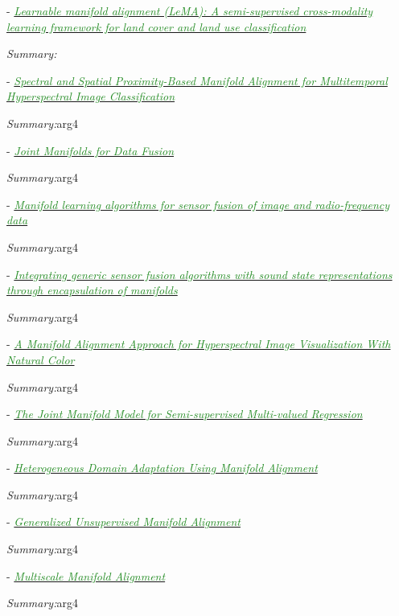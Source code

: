 \documentclass[]{article}
\newcommand{\paperentry}[4]{
            \hangindent=1cm
            \cite{#1} - \href{run:../References/#3}{\textcolor{ForestGreen}{\textit{#2}}}
            
            \noindent            
            \begin{minipage}[t]{0.1\linewidth}\hfill\end{minipage}
            \begin{minipage}[t]{0.8\linewidth}\textcolor{NavyBlue}{{\textit{Summary:}}}#4\end{minipage}
            \vspace{.25cm}
          }
\begin{document}
		\paperentry{Hong2019LearnableManifoldAlignment}
		{Learnable manifold alignment (LeMA): A semi-supervised cross-modality learning framework for land cover and land use classification}
		{Manifold_Representation_Learning/Alignment/Hong2019LearnableManifoldAlignment.pdf}
		{}
		
		\paperentry{Yang2016ManifoldAlignmentMultitemporalHSI}
		{Spectral and Spatial Proximity-Based Manifold Alignment for Multitemporal Hyperspectral Image Classification}
		{Manifold_Representation_Learning/Alignment/Yang2016ManifoldAlignmentMultitemporalHSI.pdf}
		{arg4}
		
		\paperentry{Davenport2010JointManifoldsDataFusion}
		{Joint Manifolds for Data Fusion}
		{Manifold_Representation_Learning/Alignment/Davenport2010JointManifoldsDataFusion.pdf}
		{arg4}
		
		\paperentry{Shen2018ManifoldSensorFusionImageData}
		{Manifold learning algorithms for sensor fusion of image and radio-frequency data}
		{Manifold_Representation_Learning/Alignment/Shen2018ManifoldSensorFusionImageData.pdf}
		{arg4}
		
		\paperentry{Hertzberg2013SensorFusionStateRepManifolds}
		{Integrating generic sensor fusion algorithms with sound state representations through encapsulation of manifolds}
		{Manifold_Representation_Learning/Alignment/Hertzberg2013SensorFusionStateRepManifolds.pdf}
		{arg4}
		
		\paperentry{Liao2016ManAlignmentHSI}
		{A Manifold Alignment Approach for Hyperspectral Image Visualization With Natural Color}
		{Manifold_Representation_Learning/Alignment/Liao2016ManAlignmentHSI.pdf}
		{arg4}
		
		\paperentry{Navaratnam2007JointManifoldSemiSupRegression}
		{The Joint Manifold Model for Semi-supervised Multi-valued Regression}
		{Manifold_Representation_Learning/Alignment/Navaratnam2007JointManifoldSemiSupRegression.pdf}
		{arg4}
		
		\paperentry{Wang2011HeteroDomainAdaptationManAlignment}
		{Heterogeneous Domain Adaptation Using Manifold Alignment}
		{Manifold_Representation_Learning/Alignment/Wang2011HeteroDomainAdaptationManAlignment.pdf}
		{arg4}
		
		
		\paperentry{Cui2014GenUnsupManifoldAlignment}
		{Generalized Unsupervised Manifold Alignment}
		{Manifold_Representation_Learning/AlignmentCui2014GenUnsupManifoldAlignment/.pdf}
		{arg4}
		
		\paperentry{Wang2010mMultiscaleManAlignment}
		{Multiscale Manifold Alignment}
		{Manifold_Representation_Learning/Alignment/Wang2010mMultiscaleManAlignment.pdf}
		{arg4}
		
\end{document}
